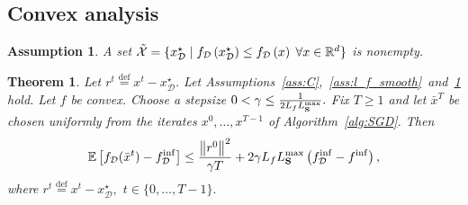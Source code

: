 \documentclass{article}
\newcommand{\cX}{{\cal X}}
\newcommand{\bb}{\mathbb}
\newcommand{\norm}[1]{\left\| #1 \right\|}
\newcommand{\cD}{\mathcal{D}}
\newcommand{\eqdef}{\stackrel{\text{def}}{=}}
\newcommand{\Exp}[1]{{\bb E}\left[#1\right]}
\newtheorem{assumption}{Assumption}
\newtheorem{theorem}{Theorem}
\theoremstyle{plain}
\newcommand{\tf}{f_{\mathcal{D}}}
\newcommand{\mS}{{\bf S}}
\theoremstyle{plain}
\theoremstyle{definition}
\theoremstyle{remark}
\begin{document}
\subsection{Convex analysis}
\begin{assumption}\label{ass:minimizers_exist}
	A set $\tilde{\cX}=\{x_\cD^\star\;|\;\tf\left(x_\cD^\star\right)\leq\tf\left(x\right)\;\forall x\in\mathbb{R}^d\}$ is nonempty.
\end{assumption}
\begin{theorem}
	Let $r^t\eqdef x^t - x_\cD^\star.$ Let Assumptions~\ref{ass:C},~\ref{ass:l_f_smooth}~and~\ref{ass:minimizers_exist} hold. Let $f$ be convex. Choose a stepsize $0<\gamma\leq\frac{1}{2L_fL_{\mS}^{\max}}.$ Fix $T\geq 1$ and let $\bar{x}^T$ be chosen uniformly from the iterates $x^0,\ldots,x^{T-1}$ of Algorithm~\ref{alg:SGD}. Then
	\begin{equation}\label{eq:main_convergence_cvx_basicsgd}
		\begin{split}
			\Exp{\tf(\bar{x}^t) - \tf^{\inf}} &\leq \frac{\norm{r^0}^2}{\gamma T} + 2\gamma L_fL_{\mS}^{\max}\left(\tf^{\inf} - f^{\inf}\right),\\
		\end{split}
	\end{equation}
	where $r^t\eqdef x^t - x_\cD^\star,$ $t\in\{0,\ldots,T-1\}.$
\end{theorem}
\end{document}
